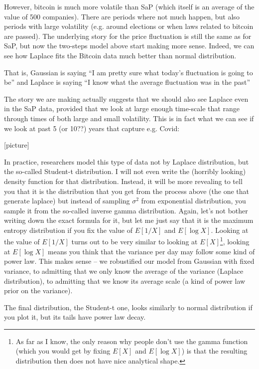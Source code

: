 \documentclass{article}
\begin{document}
However, bitcoin is much more volatile than SaP (which itself is an average of the value of 500 companies). There are periods where not much happen, but also periods with large volatility (e.g. around elections or when laws related to bitcoin are passed). The underlying story for the price fluctuation is still the same as for SaP, but now the two-steps model above start making more sense. Indeed, we can see how Laplace fits the Bitcoin data much better than normal distribution. 

That is, Gaussian is saying ``I am pretty sure what today's fluctuation is going to be'' and Laplace is saying ``I know what the average fluctuation was in the past''

The story we are making actually suggests that we should also see Laplace even in the SaP data, provided that we look at large enough time-scale that range through times of both large and small volatility. This is in fact what we can see if we look at past 5 (or 10??) years that capture e.g. Covid:

[picture]

In practice, researchers model this type of data not by Laplace distribution, but the so-called Student-t distribution. I will not even write the (horribly looking) density function for that distribution. Instead, it will be more revealing to tell you that it is the distribution that you get from the process above (the one that generate laplace) but instead of sampling $\sigma^2$ from exponential distribution, you sample it from the so-called inverse gamma distribution. Again, let's not bother writing down the exact formula for it, but let me just say that it is the maximum entropy distribution if you fix the value of $E[1/X]$ and $E[\log X]$. Looking at the value of $E[1/X]$ turns out to be very similar to looking at $E[X]$\footnote{As far as I know, the only reason why people don't use the gamma function (which you would get by fixing $E[X]$ and $E[\log X]$) is that the resulting distribution then does not have nice analytical shape. }, looking at $E[\log X]$ means you think that the variance per day may follow some kind of power law. This makes sense -- we robustified our model from Gaussian with fixed variance, to admitting that we only know the average of the variance (Laplace distribution), to admitting that we know its average scale (a kind of power law prior on the variance). 

The final distribution, the Student-t one, looks similarly to normal distribution if you plot it, but its tails have power law decay. 
\end{document}

